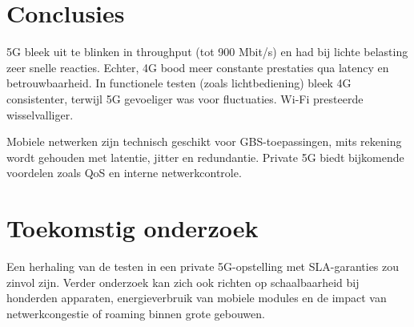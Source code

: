 \documentclass[a0,portrait]{hogent-poster}
\begin{document}
\begin{multicols}{2}
\section{Conclusies}

5G bleek uit te blinken in throughput (tot 900 Mbit/s) en had bij lichte belasting zeer snelle reacties. Echter, 4G bood meer constante prestaties qua latency en betrouwbaarheid. In functionele testen (zoals lichtbediening) bleek 4G consistenter, terwijl 5G gevoeliger was voor fluctuaties. Wi-Fi presteerde wisselvalliger.

Mobiele netwerken zijn technisch geschikt voor GBS-toepassingen, mits rekening wordt gehouden met latentie, jitter en redundantie. Private 5G biedt bijkomende voordelen zoals QoS en interne netwerkcontrole.

\section{Toekomstig onderzoek}

Een herhaling van de testen in een private 5G-opstelling met SLA-garanties zou zinvol zijn. Verder onderzoek kan zich ook richten op schaalbaarheid bij honderden apparaten, energieverbruik van mobiele modules en de impact van netwerkcongestie of roaming binnen grote gebouwen.

\end{multicols}
\end{document}
